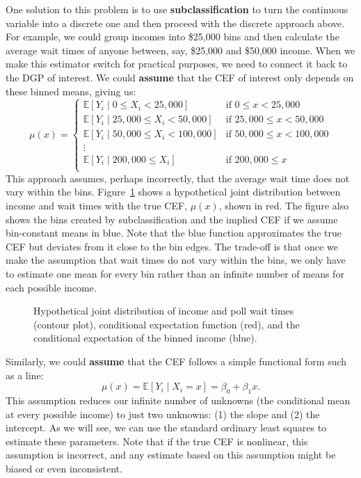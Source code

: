 \documentclass[
  13pt,
  letterpaper,
  DIV=11,
  numbers=noendperiod]{scrreprt}
\newcommand{\E}{\mathbb{E}}
\theoremstyle{definition}
\theoremstyle{definition}
\theoremstyle{plain}
\theoremstyle{remark}
\begin{document}
One solution to this problem is to use \textbf{subclassification} to
turn the continuous variable into a discrete one and then proceed with
the discrete approach above. For example, we could group incomes into
\$25,000 bins and then calculate the average wait times of anyone
between, say, \$25,000 and \$50,000 income. When we make this estimator
switch for practical purposes, we need to connect it back to the DGP of
interest. We could \textbf{assume} that the CEF of interest only depends
on these binned means, giving us:\\
\[
\mu(x) = 
\begin{cases}
  \E[Y_{i} \mid 0 \leq X_{i} < 25,000] &\text{if } 0 \leq x < 25,000 \\
  \E[Y_{i} \mid 25,000 \leq X_{i} < 50,000] &\text{if } 25,000 \leq x < 50,000\\
  \E[Y_{i} \mid 50,000 \leq X_{i} < 100,000] &\text{if } 50,000 \leq x < 100,000\\
  \vdots \\
  \E[Y_{i} \mid 200,000 \leq X_{i}] &\text{if } 200,000 \leq x\\
\end{cases}
\] This approach assumes, perhaps incorrectly, that the average wait
time does not vary within the bins. Figure~\ref{fig-cef-binned} shows a
hypothetical joint distribution between income and wait times with the
true CEF, \(\mu(x)\), shown in red. The figure also shows the bins
created by subclassification and the implied CEF if we assume
bin-constant means in blue. Note that the blue function approximates the
true CEF but deviates from it close to the bin edges. The trade-off is
that once we make the assumption that wait times do not vary within the
bins, we only have to estimate one mean for every bin rather than an
infinite number of means for each possible income.

\begin{figure}[th]


\caption{\label{fig-cef-binned}Hypothetical joint distribution of income
and poll wait times (contour plot), conditional expectation function
(red), and the conditional expectation of the binned income (blue).}

\end{figure}%

Similarly, we could \textbf{assume} that the CEF follows a simple
functional form such as a line: \[ 
\mu(x) = \E[Y_{i}\mid X_{i} = x] = \beta_{0} + \beta_{1} x.
\] This assumption reduces our infinite number of unknowns (the
conditional mean at every possible income) to just two unknowns: (1) the
slope and (2) the intercept. As we will see, we can use the standard
ordinary least squares to estimate these parameters. Note that if the
true CEF is nonlinear, this assumption is incorrect, and any estimate
based on this assumption might be biased or even inconsistent.
\end{document}

